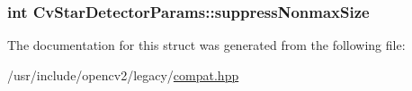 \hypertarget{structCvStarDetectorParams_a213ff31a306fcf3fbace6939d8154cd4}{
\subsubsection[{suppress\-Nonmax\-Size}]{\setlength{\rightskip}{0pt plus 5cm}int Cv\-Star\-Detector\-Params\-::suppress\-Nonmax\-Size}}\label{structCvStarDetectorParams_a213ff31a306fcf3fbace6939d8154cd4}


The documentation for this struct was generated from the following file\-:\begin{DoxyCompactItemize}
\item 
/usr/include/opencv2/legacy/\hyperlink{compat_8hpp}{compat.\-hpp}\end{DoxyCompactItemize}
